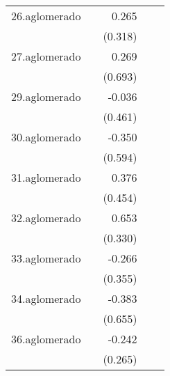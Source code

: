 {\begin{longtable}{l*{4}{D{.}{.}{-1}}}
\addlinespace
26.aglomerado&                     &       0.265         &                     &                     \\
            &                     &     (0.318)         &                     &                     \\
\addlinespace
27.aglomerado&                     &       0.269         &                     &                     \\
            &                     &     (0.693)         &                     &                     \\
\addlinespace
29.aglomerado&                     &      -0.036         &                     &                     \\
            &                     &     (0.461)         &                     &                     \\
\addlinespace
30.aglomerado&                     &      -0.350         &                     &                     \\
            &                     &     (0.594)         &                     &                     \\
\addlinespace
31.aglomerado&                     &       0.376         &                     &                     \\
            &                     &     (0.454)         &                     &                     \\
\addlinespace
32.aglomerado&                     &       0.653\sym{*}  &                     &                     \\
            &                     &     (0.330)         &                     &                     \\
\addlinespace
33.aglomerado&                     &      -0.266         &                     &                     \\
            &                     &     (0.355)         &                     &                     \\
\addlinespace
34.aglomerado&                     &      -0.383         &                     &                     \\
            &                     &     (0.655)         &                     &                     \\
\addlinespace
36.aglomerado&                     &      -0.242         &                     &                     \\
            &                     &     (0.265)         &                     &                     \\

\end{longtable}}
